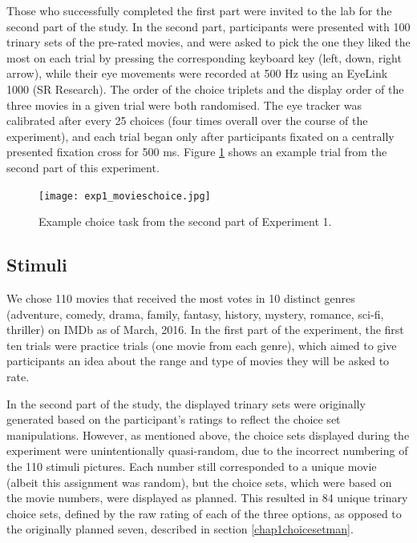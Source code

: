 \documentclass[11pt,a4paper]{article}
\begin{document}
Those who successfully completed the first part were invited to the lab for the second part of the study. In the second part, participants were presented with 100 trinary sets of the pre-rated movies, and were asked to pick the one they liked the most on each trial by pressing the corresponding keyboard key (left, down, right arrow), while their eye movements were recorded at 500 Hz using an EyeLink 1000 (SR Research). The order of the choice triplets and the display order of the three movies in a given trial were both randomised. The eye tracker was calibrated after every 25 choices (four times overall over the course of the experiment), and each trial began only after participants fixated on a centrally presented fixation cross for 500 ms. Figure \ref{fig:exp1_movieschoice} shows an example trial from the second part of this experiment.

\begin{figure}[htb!]
\captionsetup{justification=centering}
\centering
\caption{Example choice task from the second part of Experiment 1. }
\texttt{[image: exp1\_movieschoice.jpg]}
\label{fig:exp1_movieschoice}
\end{figure}



\subsection{Stimuli}

We chose 110 movies that received the most votes in 10 distinct genres (adventure, comedy, drama, family, fantasy, history, mystery, romance, sci-fi, thriller) on IMDb as of March, 2016. In the first part of the experiment, the first ten trials were practice trials (one movie from each genre), which aimed to give participants an idea about the range and type of movies they will be asked to rate. 

In the second part of the study, the displayed trinary sets were originally generated based on the participant's ratings to reflect the choice set manipulations. However, as mentioned above, the choice sets displayed during the experiment were unintentionally quasi-random, due to the incorrect numbering of the 110 stimuli pictures. Each number still corresponded to a unique movie (albeit this assignment was random), but the choice sets, which were based on the movie numbers, were displayed as planned. This resulted in 84 unique trinary choice sets, defined by the raw rating of each of the three options, as opposed to the originally planned seven, described in section \ref{chap1choicesetman}. 
\end{document}
